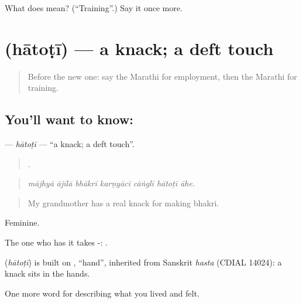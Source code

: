 \begin{tcolorbox}[breakable,colback=teal!4,colframe=teal!35!black,title={Before you move on}]
What does  mean? (\textquotedblleft{}Training\textquotedblright{}.) Say it once more.
\end{tcolorbox}
\section[\texorpdfstring{\mr{हातोटी} (hātoṭī)}{हातोटी (hātoṭī)}]{ (hātoṭī) — a knack; a deft touch}

\label{lesson:MR-C507-hatoti}



\begin{quote}
Before the new one: say the Marathi for employment, then the Marathi for training.
\end{quote}

\subsection*{You'll want to know: }
\textbf{} — \emph{hātoṭī} — \textquotedblleft{}a knack; a deft touch\textquotedblright{}.

\begin{quote}
      .
\end{quote}

\begin{quote}
\emph{mājhyā ājīlā bhākrī karṇyācī cāṅglī hātoṭī āhe.}
\end{quote}

\begin{quote}
My grandmother has a real knack for making bhakri.
\end{quote}

Feminine.

The one who has it takes -:   .

\begin{cousinweb}
\textbf{} (\emph{hātoṭī}) is built on , \textquotedblleft{}hand\textquotedblright{}, inherited from Sanskrit \emph{hasta} (CDIAL 14024): a knack sits in the hands.
\end{cousinweb}

\begin{grammarlens}[title={What you've built}]
One more word for describing what you lived and felt.
\end{grammarlens}

